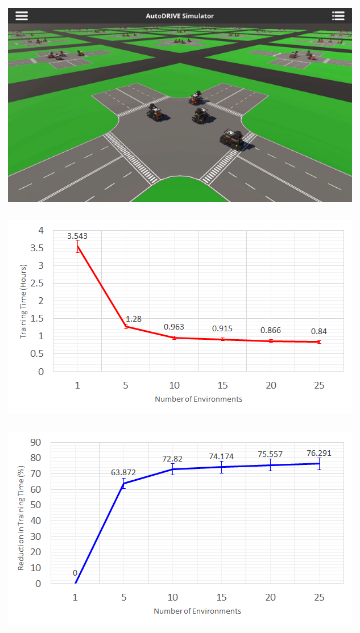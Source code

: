 \documentclass[letterpaper, 10 pt, conference]{ieeeconf}  %
\begin{document}
\begin{figure}[t]
     \centering
     \begin{subfigure}[b]{0.32\linewidth}
         \centering
         \includegraphics[width=\linewidth]{Fig7a.png}
         \caption{}
         \label{fig7a}
     \end{subfigure}
     \hfill
     \begin{subfigure}[b]{0.32\linewidth}
         \centering
         \includegraphics[width=\linewidth]{Fig7b.png}
         \caption{}
         \label{fig7b}
     \end{subfigure}
     \hfill
     \begin{subfigure}[b]{0.32\linewidth}
         \centering
         \includegraphics[width=\linewidth]{Fig7c.png}

\end{subfigure}
\end{figure}
\end{document}
